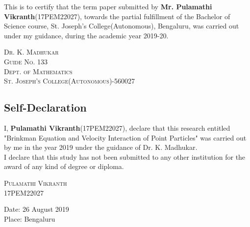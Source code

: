 \documentclass[12pt]{article}
\begin{document}

\begin{center}
\vspace{40mm}
This is to certify that the term paper submitted by \textbf{Mr. Pulamathi Vikranth}(17PEM22027), towards the partial fulfillment of the Bachelor of Science course, St. Joseph's College(Autonomous), Bengaluru, was carried out under my guidance, during the academic year 2019-20.\\


\end{center}
\vspace{60mm}
\begin{flushright}
\textsc{Dr. K. Madhukar\\Guide No. 133\\ Dept. of Mathematics\\ St. Joseph's College(Autonomous)-560027}
\end{flushright}




\cleardoublepage

\begin{center}
\section*{Self-Declaration}
\end{center}


\begin{center}
\vspace{30mm}
I, \textbf{Pulamathi Vikranth}(17PEM22027), declare that this research entitled "Brinkman Equation and Velocity Interaction of Point Particles" was carried out by me in the year 2019 under the guidance of Dr. K. Madhukar.\\
\vspace{15mm}
I declare that this study has not been submitted to any other institution for the award of any kind of degree or diploma. 

\end{center}
\vspace{50mm}
\begin{flushright}
\textsc{Pulamathi Vikranth\\17PEM22027}
\end{flushright}
\vspace{20mm}
\begin{flushleft}
Date: 26 August 2019\\
Place: Bengaluru
\end{flushleft}
\end{document}
